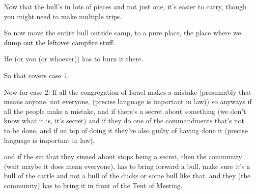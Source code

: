 {
}
{
}
{
	Now that the bull's in lots of pieces and not just one, it's
	easier to carry, though you might need to make multiple trips.
	
	So now move the entire bull outside camp, to a pure place,
	the place where we dump out the leftover campfire stuff.

	He (or you (or whoever)) has to burn it there.
}

{
}
{
}
{
	So that covers case 1.

	Now for case 2: If all the congregation of Israel makes a
	mistake (presumably that means anyone, not everyone,
	(precise language is important in law)) so anyways if
	all the people make a mistake, and if there's a secret
	about something (we don't know what it is, it's secret)
	and if they do one of the commandments that's not to
	be done, and if on top of doing it they're also guilty
	of having done it (precise language is important in law),
}

{
}
{
}
{
	and if the sin that they sinned about stops being a secret,
	then the community (wait maybe it does mean everyone),
	has to bring forward a bull, make sure it's a bull of the
	cattle and not a bull of the ducks or some bull
	like that, and they (the community) has to bring it in front
	of the Tent of Meeting.
}

